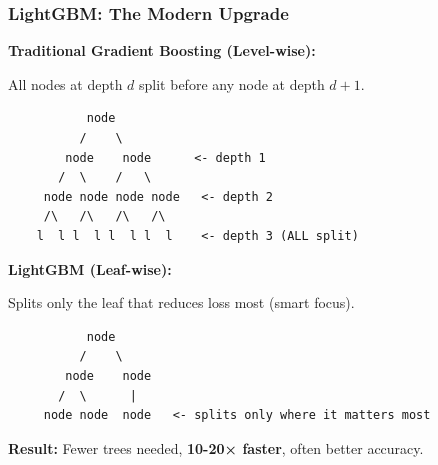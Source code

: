 \documentclass{beamer}
\begin{document}
\begin{frame}[fragile]
\frametitle{LightGBM: The Modern Upgrade}

\textbf{Traditional Gradient Boosting (Level-wise):}

All nodes at depth $d$ split before any node at depth $d+1$.

\vspace{0.2cm}
\begin{center}
{\tiny
\begin{verbatim}
           node
          /    \
        node    node      <- depth 1
       /  \    /   \
     node node node node   <- depth 2
     /\   /\   /\   /\
    l  l l  l l  l l  l    <- depth 3 (ALL split)
\end{verbatim}
}
\end{center}

\vspace{0.2cm}
\textbf{LightGBM (Leaf-wise):}

Splits only the leaf that reduces loss most (smart focus).

\vspace{0.2cm}
\begin{center}
{\tiny
\begin{verbatim}
           node
          /    \
        node    node
       /  \      |
     node node  node   <- splits only where it matters most
\end{verbatim}
}
\end{center}

\vspace{0.2cm}
\textbf{Result:} Fewer trees needed, \textbf{10-20× faster}, often better accuracy.

\end{frame}
\end{document}
